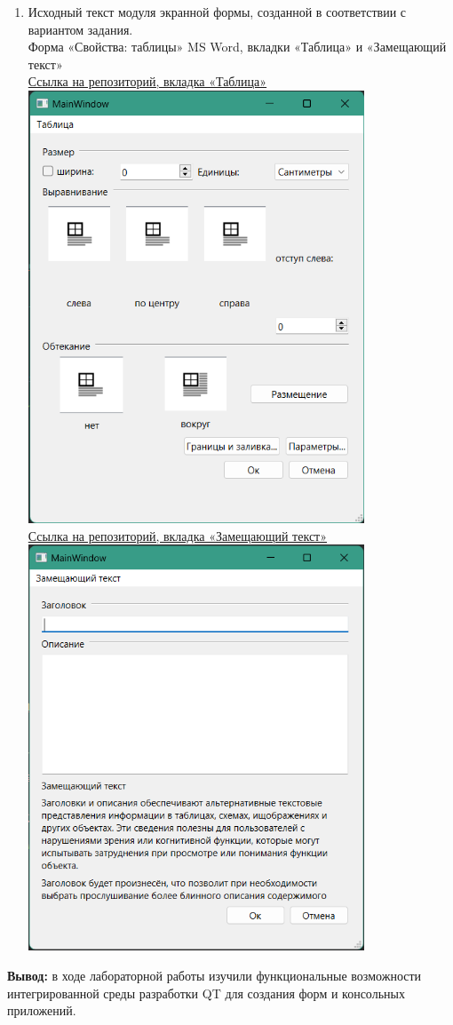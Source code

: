 \documentclass[a4paper,14pt]{extarticle}
\begin{document}
\begin{enumerate}[1.]
    \item Исходный текст модуля экранной формы, созданной в соответствии с
    вариантом задания.\\
    Форма «Свойства: таблицы» MS Word, вкладки «Таблица» и
«Замещающий текст»\\
    \href{https://github.com/IAmProgrammist/oop/tree/master/src/lab1/task3}{Ссылка на репозиторий, вкладка «Таблица»}\\
    \includegraphics[width=100mm]{table}\\
    
    \href{https://github.com/IAmProgrammist/oop/tree/master/src/lab1/task4}{Ссылка на репозиторий, вкладка «Замещающий текст»}\\ 
    \includegraphics[width=100mm]{replace_text}\\
        \end{enumerate}

\textbf{Вывод: } в ходе лабораторной работы изучили функциональные возможности интегрированной
среды разработки QT для создания форм и консольных приложений.
\end{document}
